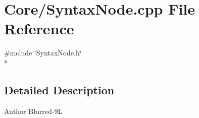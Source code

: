 \section{Core/\-Syntax\-Node.cpp File Reference}
\label{_syntax_node_8cpp}
{\ttfamily \#include \char`\"{}Syntax\-Node.\-h\char`\"{}}\\*


\subsection{Detailed Description}
\begin{DoxyAuthor}{Author}
Blurred-\/9\-L 
\end{DoxyAuthor}
